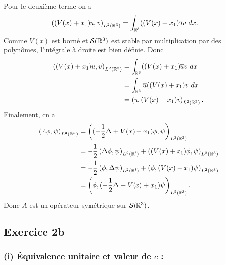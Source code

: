 Pour le deuxième terme on a
\begin{align}
    \left( (V(x) + x_1) u, v \right)_{L^2(\mathbb{R}^3)}
    &= \int_{\mathbb{R}^3} ((V(x) + x_1) \overline u v \ dx.
\end{align}
%
Comme $V(x)$ est borné et $\mathcal{S}(\mathbb{R}^3)$ est stable par
multiplication par des
polynômes, l'intégrale à droite est bien définie. Donc
\begin{align}
    \left( (V(x) + x_1) u, v \right)_{L^2(\mathbb{R}^3)}
    &= \int_{\mathbb{R}^3} ((V(x) + x_1) \overline u v \ dx \\
    &= \int_{\mathbb{R}^3}  \overline u ((V(x) + x_1) v \ dx \\
    &= \left( u, (V(x) + x_1) v \right)_{L^2(\mathbb{R}^3)}.
\end{align}
%
Finalement, on a
\begin{align}
    \left( A \phi, \psi \right)_{L^2(\mathbb{R}^3)} &= \left( (-\frac{1}{2} \Delta + V(x) + x_1) \phi, \psi \right)_{L^2(\mathbb{R}^3)} \\
    &= -\frac{1}{2} \left( \Delta \phi, \psi \right)_{L^2(\mathbb{R}^3)} + \left( (V(x) + x_1) \phi, \psi \right)_{L^2(\mathbb{R}^3)} \\
    &= -\frac{1}{2} \left( \phi, \Delta \psi \right)_{L^2(\mathbb{R}^3)} + \left( \phi, (V(x) + x_1) \psi \right)_{L^2(\mathbb{R}^3)} \\
    &= \left( \phi, (-\frac{1}{2} \Delta + V(x) + x_1) \psi \right)_{L^2(\mathbb{R}^3)}.
\end{align}
%
Donc $A$ est un opérateur symétrique sur $\mathcal{S}(\mathbb{R}^3)$.


\subsection*{Exercice 2b}

\subsubsection*{(i) Équivalence unitaire et valeur de $c$ :}


